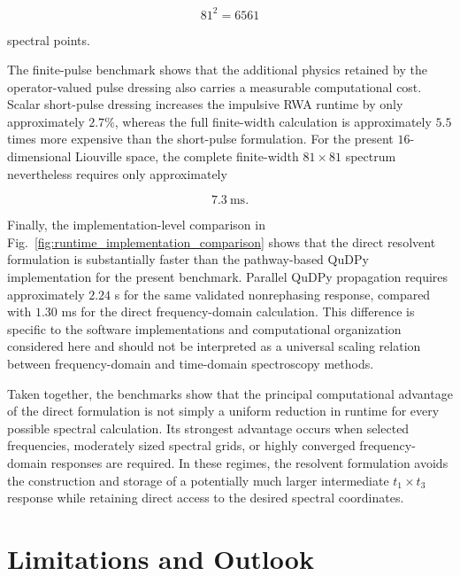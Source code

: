 \documentclass[11pt]{article}
\begin{document}
\begin{equation}
81^2
=
6561
\end{equation}

spectral points.

The finite-pulse benchmark shows that the additional physics retained
by the operator-valued pulse dressing also carries a measurable
computational cost.  Scalar short-pulse dressing increases the
impulsive RWA runtime by only approximately $2.7\%$, whereas the full
finite-width calculation is approximately $5.5$ times more expensive
than the short-pulse formulation.  For the present
$16$-dimensional Liouville space, the complete finite-width
$81\times81$ spectrum nevertheless requires only approximately

\begin{equation}
7.3\ \mathrm{ms}.
\end{equation}

Finally, the implementation-level comparison in
Fig.~\ref{fig:runtime_implementation_comparison} shows that the direct
resolvent formulation is substantially faster than the pathway-based
QuDPy implementation for the present benchmark.  Parallel QuDPy
propagation requires approximately $2.24$ s for the same validated
nonrephasing response, compared with $1.30$ ms for the direct
frequency-domain calculation.  This difference is specific to the
software implementations and computational organization considered
here and should not be interpreted as a universal scaling relation
between frequency-domain and time-domain spectroscopy methods.

Taken together, the benchmarks show that the principal computational
advantage of the direct formulation is not simply a uniform reduction
in runtime for every possible spectral calculation.  Its strongest
advantage occurs when selected frequencies, moderately sized spectral
grids, or highly converged frequency-domain responses are required.
In these regimes, the resolvent formulation avoids the construction
and storage of a potentially much larger intermediate
$t_1\times t_3$ response while retaining direct access to the desired
spectral coordinates.


\section{Limitations and Outlook}
\label{sec:limitations_outlook}
\end{document}
